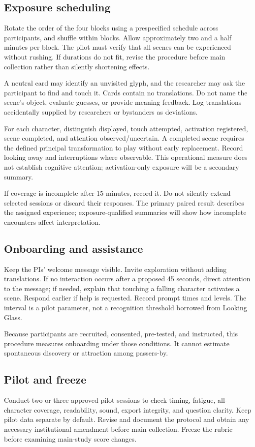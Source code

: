 \documentclass[11pt,letterpaper]{article}
\begin{document}
\subsection{Exposure scheduling}
Rotate the order of the four blocks using a prespecified schedule across participants, and shuffle within blocks. Allow approximately two and a half minutes per block. The pilot must verify that all scenes can be experienced without rushing. If durations do not fit, revise the procedure before main collection rather than silently shortening effects.

A neutral card may identify an unvisited glyph, and the researcher may ask the participant to find and touch it. Cards contain no translations. Do not name the scene's object, evaluate guesses, or provide meaning feedback. Log translations accidentally supplied by researchers or bystanders as deviations.

For each character, distinguish displayed, touch attempted, activation registered, scene completed, and attention observed/uncertain. A completed scene requires the defined principal transformation to play without early replacement. Record looking away and interruptions where observable. This operational measure does not establish cognitive attention; activation-only exposure will be a secondary summary.

If coverage is incomplete after 15 minutes, record it. Do not silently extend selected sessions or discard their responses. The primary paired result describes the assigned experience; exposure-qualified summaries will show how incomplete encounters affect interpretation.

\subsection{Onboarding and assistance}
Keep the PIs' welcome message visible. Invite exploration without adding translations. If no interaction occurs after a proposed 45 seconds, direct attention to the message; if needed, explain that touching a falling character activates a scene. Respond earlier if help is requested. Record prompt times and levels. The interval is a pilot parameter, not a recognition threshold borrowed from Looking Glass.

Because participants are recruited, consented, pre-tested, and instructed, this procedure measures onboarding under those conditions. It cannot estimate spontaneous discovery or attraction among passers-by.

\subsection{Pilot and freeze}
Conduct two or three approved pilot sessions to check timing, fatigue, all-character coverage, readability, sound, export integrity, and question clarity. Keep pilot data separate by default. Revise and document the protocol and obtain any necessary institutional amendment before main collection. Freeze the rubric before examining main-study score changes.
\end{document}
